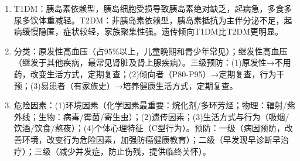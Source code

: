 {\begin{enumerate}[leftmargin=*, itemsep=5pt]
    \item T1DM：胰岛素依赖型，胰岛细胞受损导致胰岛素绝对缺乏，起病急，多食多尿多饮体重减轻。T2DM：非胰岛素依赖型，胰岛素抵抗为主伴分泌不足，起病缓慢隐匿，症状较轻，家族聚集性强。遗传倾向T1DM比T2DM更明显。

    \item 分类：原发性高血压（占95\%以上，儿童晚期和青少年常见）；继发性高血压（继发于其他疾病，最常见肾脏及肾上腺疾病）。三级预防：(1)原发性→不用药，改变生活方式，定期复查；(2)倾向者（P80-P95）→定期复查，行为干预；(3)易患者（有家族史）→培养健康生活方式，定期复查。

    \item 危险因素：(1)环境因素（化学因素最重要：烷化剂/多环芳烃；物理：辐射/紫外线；生物：病毒/霉菌/寄生虫）；(2)遗传因素；(3)生活方式与行为（吸烟/饮酒/饮食/熬夜）；(4)个体心理特征（C型行为）。预防：一级（病因预防，改善环境，改变行为危险因素，加强防癌健康教育）；二级（早发现早诊断早治疗）；三级（减少并发症，防止伤残，提供临终关怀）。
\end{enumerate}
}

\newpage
